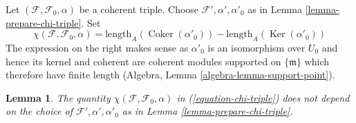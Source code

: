 \documentclass{stacks-project}
\theoremstyle{plain}
\newtheorem{lemma}[subsection]{Lemma}
\theoremstyle{definition}
\theoremstyle{remark}
\numberwithin{equation}{subsection}
\def\Ker{\mathop{\mathrm{Ker}}}
\def\Coker{\mathop{\mathrm{Coker}}}
\begin{document}
\noindent
Let $(\mathcal{F}, \mathcal{F}_0, \alpha)$ be a coherent triple.
Choose $\mathcal{F}', \alpha', \alpha'_0$ as in
Lemma \ref{lemma-prepare-chi-triple}. Set
\begin{equation}
\label{equation-chi-triple}
\chi(\mathcal{F}, \mathcal{F}_0, \alpha) =
\text{length}_A(\Coker(\alpha'_0)) - 
\text{length}_A(\Ker(\alpha'_0))
\end{equation}
The expression on the right makes sense as $\alpha'_0$ is an isomorphism
over $U_0$ and hence its kernel and coherent are coherent modules supported
on $\{\mathfrak m\}$ which therefore have finite length
(Algebra, Lemma \ref{algebra-lemma-support-point}).

\begin{lemma}
\label{lemma-well-defined-chi-triple}
The quantity $\chi(\mathcal{F}, \mathcal{F}_0, \alpha)$ in
(\ref{equation-chi-triple}) does not depend on the choice of
$\mathcal{F}', \alpha', \alpha'_0$ as in Lemma \ref{lemma-prepare-chi-triple}.
\end{lemma}
\end{document}
